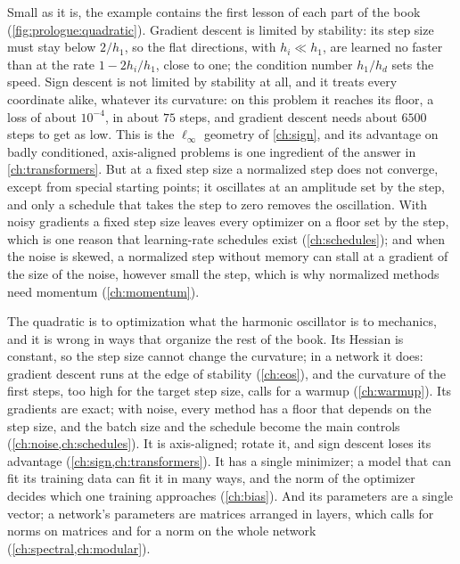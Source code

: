 \begin{refsection}
Small as it is, the example contains the first lesson of each part of the book (\cref{fig:prologue:quadratic}). Gradient descent is limited by stability: its step size must stay below $2/h_1$, so the flat directions, with $h_i\ll h_1$, are learned no faster than at the rate $1-2h_i/h_1$, close to one; the condition number $h_1/h_d$ sets the speed. Sign descent is not limited by stability at all, and it treats every coordinate alike, whatever its curvature: on this problem it reaches its floor, a loss of about $10^{-4}$, in about $75$ steps, and gradient descent needs about $6500$ steps to get as low. This is the $\ell_\infty$ geometry of \cref{ch:sign}, and its advantage on badly conditioned, axis-aligned problems is one ingredient of the answer in \cref{ch:transformers}. But at a fixed step size a normalized step does not converge, except from special starting points; it oscillates at an amplitude set by the step, and only a schedule that takes the step to zero removes the oscillation. With noisy gradients a fixed step size leaves every optimizer on a floor set by the step, which is one reason that learning-rate schedules exist (\cref{ch:schedules}); and when the noise is skewed, a normalized step without memory can stall at a gradient of the size of the noise, however small the step, which is why normalized methods need momentum (\cref{ch:momentum}).


The quadratic is to optimization what the harmonic oscillator is to mechanics, and it is wrong in ways that organize the rest of the book. Its Hessian is constant, so the step size cannot change the curvature; in a network it does: gradient descent runs at the edge of stability (\cref{ch:eos}), and the curvature of the first steps, too high for the target step size, calls for a warmup (\cref{ch:warmup}). Its gradients are exact; with noise, every method has a floor that depends on the step size, and the batch size and the schedule become the main controls (\cref{ch:noise,ch:schedules}). It is axis-aligned; rotate it, and sign descent loses its advantage (\cref{ch:sign,ch:transformers}). It has a single minimizer; a model that can fit its training data can fit it in many ways, and the norm of the optimizer decides which one training approaches (\cref{ch:bias}). And its parameters are a single vector; a network's parameters are matrices arranged in layers, which calls for norms on matrices and for a norm on the whole network (\cref{ch:spectral,ch:modular}).


\end{refsection}
